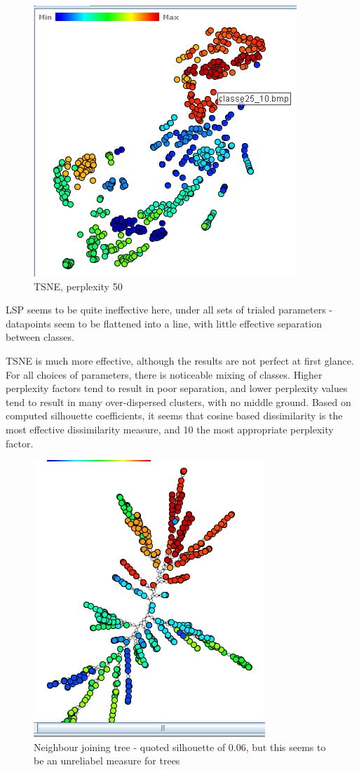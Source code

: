 \documentclass[ 10pt ]{fphw}
\begin{document}
\begin{center}
\begin{figure}[H]
    \centering
	\includegraphics[width=0.65\columnwidth]{task2d/medTSNE50.PNG}
	\caption{TSNE, perplexity 50}
	\label{fig:med50}
	\end{figure}
\end{center}

LSP seems to be quite ineffective here, under all sets of trialed parameters - datapoints seem to be flattened into a line, with little effective separation between classes.

TSNE is much more effective, although the results are not perfect at first glance. For all choices of parameters, there is noticeable mixing of classes. Higher perplexity factors tend to result in poor separation, and lower perplexity values tend to result in many over-dispersed clusters, with no middle ground. Based on computed silhouette coefficients, it seems that cosine based dissimilarity is the most effective dissimilarity measure, and 10 the most appropriate perplexity factor.

\begin{center}
\begin{figure}[H]
    \centering
	\includegraphics[width=0.45\columnwidth]{task2d/medNJ.PNG}
	\caption{Neighbour joining tree - quoted silhouette of 0.06, but this seems to be an unreliabel measure for trees}
	\label{fig:medNJ}
	\end{figure}
\end{center}
\end{document}
